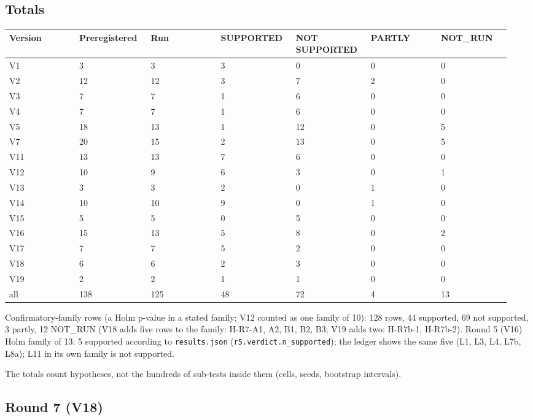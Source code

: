 \subsection*{Totals}

{\scriptsize\raggedright
\begin{longtable}{p{0.136\linewidth}p{0.136\linewidth}p{0.136\linewidth}p{0.136\linewidth}p{0.136\linewidth}p{0.136\linewidth}p{0.136\linewidth}}
\toprule
Version & Preregistered & Run & SUPPORTED & NOT SUPPORTED & PARTLY & NOT\_RUN \\
\midrule
\endhead
V1 & 3 & 3 & 3 & 0 & 0 & 0 \\
V2 & 12 & 12 & 3 & 7 & 2 & 0 \\
V3 & 7 & 7 & 1 & 6 & 0 & 0 \\
V4 & 7 & 7 & 1 & 6 & 0 & 0 \\
V5 & 18 & 13 & 1 & 12 & 0 & 5 \\
V7 & 20 & 15 & 2 & 13 & 0 & 5 \\
V11 & 13 & 13 & 7 & 6 & 0 & 0 \\
V12 & 10 & 9 & 6 & 3 & 0 & 1 \\
V13 & 3 & 3 & 2 & 0 & 1 & 0 \\
V14 & 10 & 10 & 9 & 0 & 1 & 0 \\
V15 & 5 & 5 & 0 & 5 & 0 & 0 \\
V16 & 15 & 13 & 5 & 8 & 0 & 2 \\
V17 & 7 & 7 & 5 & 2 & 0 & 0 \\
V18 & 6 & 6 & 2 & 3 & 0 & 0 \\
V19 & 2 & 2 & 1 & 1 & 0 & 0 \\
all & 138 & 125 & 48 & 72 & 4 & 13 \\
\bottomrule
\end{longtable}}

Confirmatory-family rows (a Holm p-value in a stated family; V12 counted as one family of 10): 128 rows, 44 supported, 69 not supported, 3 partly, 12 NOT\_RUN (V18 adds five rows to the family: H-R7-A1, A2, B1, B2, B3; V19 adds two: H-R7b-1, H-R7b-2).
Round 5 (V16) Holm family of 13: 5 supported according to \texttt{results.json} (\texttt{r5.verdict.n\_supported}); the ledger shows the same five (L1, L3, L4, L7b, L8a); L11 in its own family is not supported.

The totals count hypotheses, not the hundreds of sub-tests inside them (cells, seeds, bootstrap intervals).

\subsection*{Round 7 (V18)}

